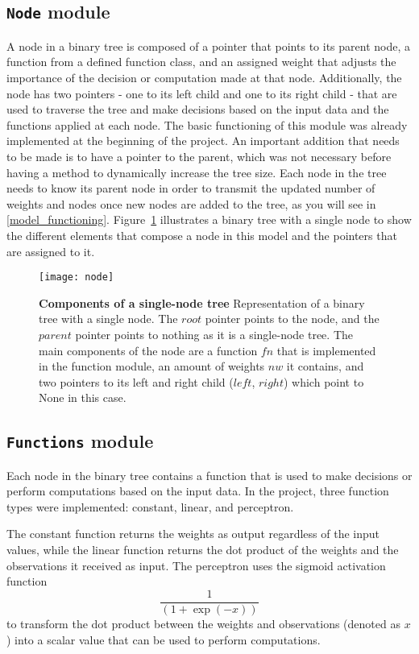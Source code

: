 \subsection{\texttt{Node} module}
A node in a binary tree is composed of a pointer that points to its parent node, a function from a defined function class, and an assigned weight that adjusts the importance of the decision or computation made at that node. Additionally, the node has two pointers - one to its left child and one to its right child - that are used to traverse the tree and make decisions based on the input data and the functions applied at each node. The basic functioning of this module was already implemented at the beginning of the project. An important addition that needs to be made is to have a pointer to the parent, which was not necessary before having a method to dynamically increase the tree size. Each node in the tree needs to know its parent node in order to transmit the updated number of weights and nodes once new nodes are added to the tree, as you will see in \ref{model_functioning}. Figure~\ref{fig:node_composition} illustrates a binary tree with a single node to show the different elements that compose a node in this model and the pointers that are assigned to it.
\begin{figure}[!ht]
\centering
\texttt{[image: node]}

\caption[Components of a single-node tree]{
  \textbf{Components of a single-node tree}
Representation of a binary tree with a single node. The $root$ pointer points to the node, and the $parent$ pointer points to nothing as it is a single-node tree. The main components of the node are a function $fn$ that is implemented in the function module, an amount of weights $nw$ it contains, and two pointers to its left and right child ($left$, $right$) which point to None in this case.
 }
\label{fig:node_composition}
\end{figure}

\subsection{\texttt{Functions} module}
Each node in the binary tree contains a function that is used to make decisions or perform computations based on the input data. In the project, three function types were implemented: constant, linear, and perceptron.

The constant function returns the weights as output regardless of the input values, while the linear function returns the dot product of the weights and the observations it received as input. The perceptron uses the sigmoid activation function
\begin{equation}
\frac{1} {(1 + \exp(-x))}
\end{equation}
 to transform the dot product between the weights and observations (denoted as $x$) into a scalar value that can be used to perform computations.

